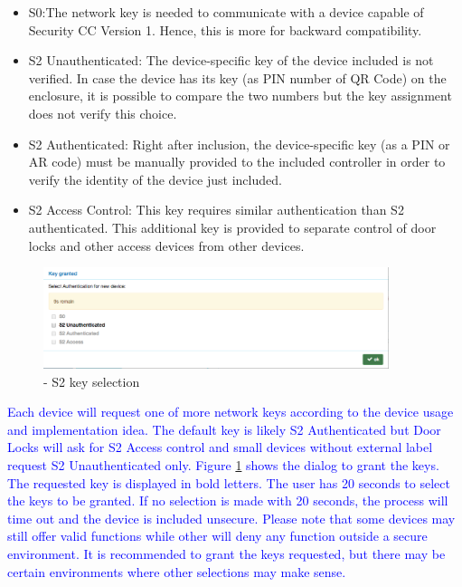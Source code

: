 \begin{itemize}
\item S0:The network key is needed to communicate with a device capable of Security CC 
Version 1. Hence, this is more for backward compatibility.
\item S2 Unauthenticated: The device-specific key of the device included is not verified. 
In case the device has its key (as PIN number of QR Code) on the enclosure, it is possible 
to compare the two numbers but the key assignment does not verify this choice.
\item S2 Authenticated: Right after inclusion, the device-specific key (as a PIN or AR code) 
must be manually provided to the included controller in order to verify the identity of the device just included.
\item S2 Access Control: This key requires similar authentication than S2 authenticated.
 This additional key is provided to separate control of door locks and other access devices from other devices.
\end{itemize}

\begin{figure}
\begin{center}
\includegraphics[width=0.9\textwidth]{pngs/cap7/security2_2.png}
\caption{\zweui - S2 key selection}
\label{security2_2}
\end{center}
\end{figure}

\textcolor{blue}{Each device will request one of more network keys according to the device 
usage and implementation idea. The default key is likely  S2 Authenticated but Door Locks 
will ask for S2 Access control and small devices without external label request S2 
Unauthenticated only. Figure \ref{security2_2} shows the dialog to grant the keys. The 
requested key is displayed in bold letters. The user has 20 seconds to select the keys to be granted.
If no selection is made with 20 seconds, the process will time out and the device is 
included unsecure. Please note that some devices may still offer valid functions 
while other will deny any function outside a secure environment. It is recommended 
to grant the keys requested, but there may be certain environments where other 
selections may make sense.}


